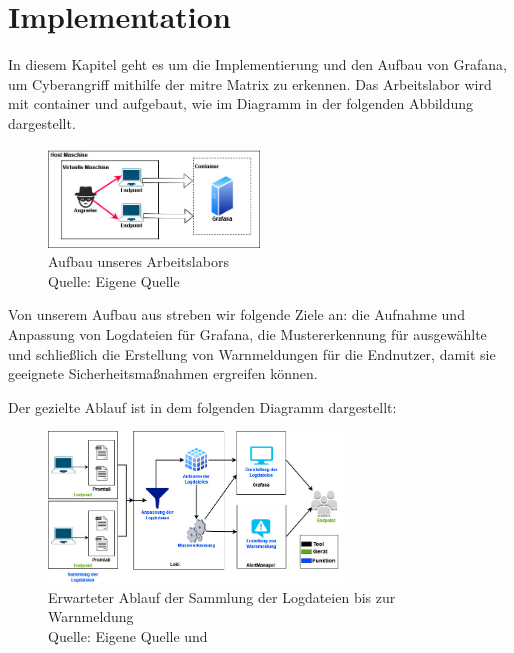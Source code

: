 \section{Implementation}
In diesem Kapitel geht es um die Implementierung und den Aufbau von Grafana, um \gls{Cyberangriff} mithilfe der \gls{mitre} Matrix zu erkennen. Das Arbeitslabor wird mit \gls{container} und  aufgebaut, wie im Diagramm in der folgenden Abbildung dargestellt.


\begin{figure}[H]
   \centering
   \includegraphics[width=0.5\textwidth]{assets/Arbeitslabor.jpg}
   \caption{Aufbau unseres Arbeitslabors \\Quelle: Eigene Quelle}
   \centering
\end{figure}

Von unserem Aufbau aus streben wir folgende Ziele an: die Aufnahme und Anpassung von Logdateien für Grafana, die Mustererkennung für ausgewählte  und schließlich die Erstellung von Warnmeldungen für die Endnutzer, damit sie geeignete Sicherheitsmaßnahmen ergreifen können.

Der gezielte Ablauf ist in dem folgenden Diagramm dargestellt:

\begin{figure}[H]
   \centering
   \includegraphics[width=0.7\textwidth]{assets/Ablauf_grafana2.jpg}
   \caption{Erwarteter Ablauf der Sammlung der Logdateien bis zur Warnmeldung \\ Quelle: Eigene Quelle und \citep{Grafana_loki}}
   \centering
\end{figure}

